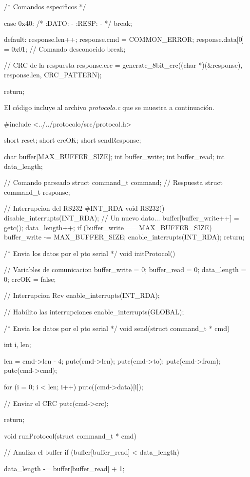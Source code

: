 \documentclass[a4paper,10pt]{article}
\begin{document}
{\begin{verbatimtab}
{{		/* Comandos especificos */

 		case 0x40:
			/* 
			:DATO:
			-
			:RESP:
			-
			*/
		break;

		default:
			response.len++;
			response.cmd = COMMON_ERROR;
			response.data[0] = 0x01; // Comando desconocido
		break;
	}	

	// CRC de la respuesta
	response.crc = generate_8bit_crc((char *)(&response), response.len, CRC_PATTERN);

	return;
}
\end{verbatimtab}
}

El c\'odigo incluye al archivo \emph{protocolo.c} que se muestra a continuaci\'on.

{\scriptsize
\begin{verbatimtab}
#include <../../protocolo/src/protocol.h>

short reset;
short crcOK;
short sendResponse;

char buffer[MAX_BUFFER_SIZE];
int buffer_write;
int buffer_read;
int data_length;

// Comando parseado
struct command_t command;
// Respuesta
struct command_t response;

// Interrupcion del RS232
#INT_RDA
void RS232()
{
	disable_interrupts(INT_RDA);
	// Un nuevo dato...
	buffer[buffer_write++] = getc();
	data_length++;
	if (buffer_write == MAX_BUFFER_SIZE)
		buffer_write -= MAX_BUFFER_SIZE;
	enable_interrupts(INT_RDA);
	return;
}

/* Envia los datos por el pto serial */
void initProtocol()
{
	// Variables de comunicacion
	buffer_write = 0;
	buffer_read = 0;
	data_length = 0;
	crcOK = false;
	
	// Interrupcion Rcv
	enable_interrupts(INT_RDA);

	// Habilito las interrupciones
	enable_interrupts(GLOBAL);
}

/* Envia los datos por el pto serial */
void send(struct command_t * cmd)
{
	int i, len;
	
	len = cmd->len - 4;
	putc(cmd->len);
	putc(cmd->to);
	putc(cmd->from);
	putc(cmd->cmd);
	
	for (i = 0; i < len; i++)
	{
		putc((cmd->data)[i]);
	}
	
	// Enviar el CRC
	putc(cmd->crc);
	
	return;	
}	

void runProtocol(struct command_t * cmd)
{
	// Analiza el buffer
	if (buffer[buffer_read] < data_length)
	{
		data_length -= buffer[buffer_read] + 1;
	
}}
\end{verbatimtab}}
\end{document}
